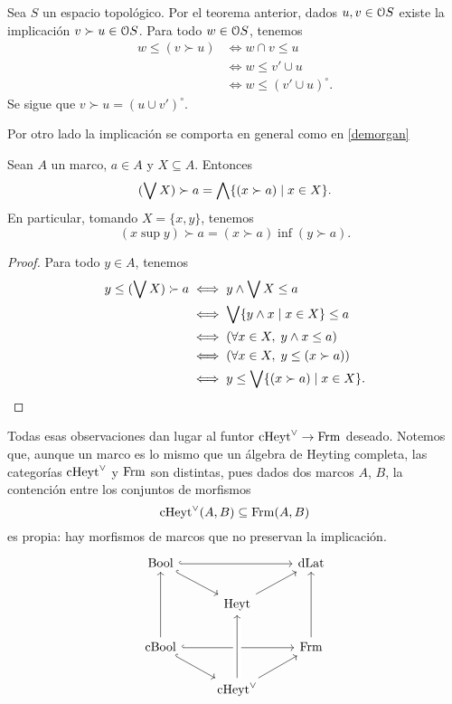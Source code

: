\begin{example}
  Sea $S$ un espacio topológico.
  Por el teorema anterior, dados $u,v\in\cal OS$
  existe la implicación $v\succ u\in \cal OS$.
  Para todo $w\in\cal OS$, tenemos
  \begin{align*}
    w\leq (v\succ u)
    &\iff w\cap v\leq u \\
    &\iff w\leq v'\cup u \\
    &\iff w\leq (v'\cup u)^\circ.
  \end{align*}
  Se sigue que $v\succ u = (u\cup v')^\circ$.
\end{example}

Por otro lado la implicación se comporta en general como en \ref{demorgan}

\begin{lemma}\label{demorim}
  Sean $A$ un marco, $a\in A$ y $X\subseteq A$.
  Entonces
  \[
      (\Sup X)\succ a = \Inf\{(x\succ a) \mid x\in X\}
  .\]
  En particular, tomando $X=\{x,y\}$, tenemos
  \[
      (x\sup y)\succ a = (x\succ a)\inf(y\succ a)
  .\]
\end{lemma}
\begin{proof}
  Para todo $y\in A$, tenemos
  \begin{align*}
      y\leq (\Sup X)\succ a
      &\iff y\inf \Sup X \leq a \\
      &\iff \Sup\{y\inf x\mid x\in X\} \leq a \\
      &\iff (\forall x\in X,\; y\inf x\leq a) \\
      &\iff (\forall x\in X,\; y\leq(x\succ a)) \\
      &\iff y\leq \Sup\{(x\succ a)\mid x\in X\}.
  \end{align*}
\end{proof}



Todas esas observaciones dan lugar al funtor $\cHeyt\to\Frm$ deseado.
Notemos que, aunque un marco es lo mismo que un álgebra de Heyting
completa, las categorías $\cHeyt$ y $\Frm$ son distintas, pues dados
dos marcos $A$, $B$, la contención entre los conjuntos de morfismos
\begin{equation}
  \cHeyt(A,B) \subseteq \Frm(A,B)
\end{equation}
es propia: hay morfismos de marcos que no preservan la implicación.
\begin{equation}\label{diag:prisma-cheyt-completo}
\begin{tikzcd}
  \Bool \ar[dr,hook] \ar[rr,hook] &               & \DLat \\
                                  & \Heyt \ar[ur]         \\
  \CBA \ar[uu] \ar[rr,hook] \ar[dr,hook] & & \Frm \ar[uu]    \\
                            & \cHeyt \ar[uu,crossing over] \ar[ur]
\end{tikzcd}
\end{equation}


